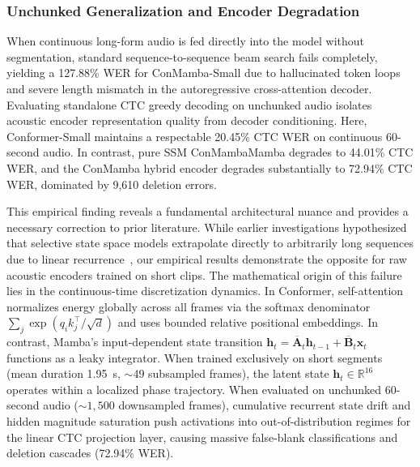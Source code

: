\documentclass[journal]{IEEEtran}
\begin{document}
\subsubsection{Unchunked Generalization and Encoder Degradation}
When continuous long-form audio is fed directly into the model without segmentation, standard sequence-to-sequence beam search fails completely, yielding a 127.88\% WER for ConMamba-Small due to hallucinated token loops and severe length mismatch in the autoregressive cross-attention decoder. Evaluating standalone CTC greedy decoding on unchunked audio isolates acoustic encoder representation quality from decoder conditioning. Here, Conformer-Small maintains a respectable 20.45\% CTC WER on continuous 60-second audio. In contrast, pure SSM ConMambaMamba degrades to 44.01\% CTC WER, and the ConMamba hybrid encoder degrades substantially to 72.94\% CTC WER, dominated by 9,610 deletion errors.

This empirical finding reveals a fundamental architectural nuance and provides a necessary correction to prior literature. While earlier investigations hypothesized that selective state space models extrapolate directly to arbitrarily long sequences due to linear recurrence~\cite{gu2023mamba,zevallos2025mamba}, our empirical results demonstrate the opposite for raw acoustic encoders trained on short clips. The mathematical origin of this failure lies in the continuous-time discretization dynamics. In Conformer, self-attention normalizes energy globally across all frames via the softmax denominator $\sum_j \exp(q_i k_j^\top / \sqrt{d})$ and uses bounded relative positional embeddings. In contrast, Mamba's input-dependent state transition $\mathbf{h}_t = \overline{\mathbf{A}}_t \mathbf{h}_{t-1} + \overline{\mathbf{B}}_t \mathbf{x}_t$ functions as a leaky integrator. When trained exclusively on short segments (mean duration 1.95~s, $\sim 49$ subsampled frames), the latent state $\mathbf{h}_t \in \mathbb{R}^{16}$ operates within a localized phase trajectory. When evaluated on unchunked 60-second audio ($\sim 1,500$ downsampled frames), cumulative recurrent state drift and hidden magnitude saturation push activations into out-of-distribution regimes for the linear CTC projection layer, causing massive false-blank classifications and deletion cascades (72.94\% WER).
\end{document}
